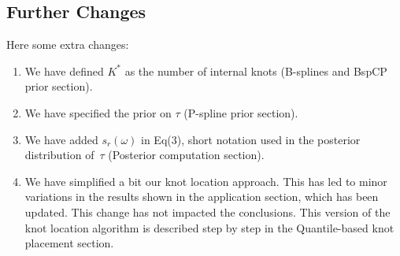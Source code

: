 \documentclass{scrartcl}
\begin{document}
\subsection*{Further Changes}
Here some extra changes:
\begin{enumerate}
	\item We have defined $K^*$ as the number of internal knots (B-splines and BspCP prior section).
	\item We have specified the prior on $\tau$ (P-spline prior section). 
	\item We have added $s_r(\omega)$ in Eq(3), short notation used in the posterior distribution of~$\tau$ (Posterior computation section).	
	\item We have simplified a bit our knot location approach.  This has led to minor variations in the results shown in the application section, which has been updated.  This change has not impacted the conclusions.  This version of the knot location algorithm is described step by step in the Quantile-based knot placement section.
\end{enumerate}




\end{document}

